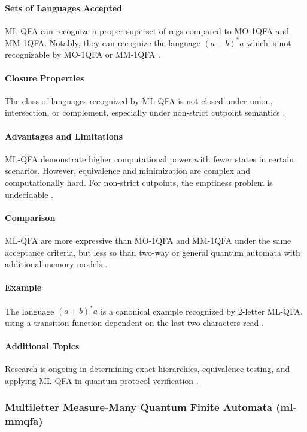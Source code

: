 \paragraph{Sets of Languages Accepted}
ML-QFA can recognize a proper superset of \glspl{reg} compared to MO-1QFA and MM-1QFA. Notably, they can recognize the language $(a + b)^*a$ which is not recognizable by MO-1QFA or MM-1QFA \cite{belovs2007multi}.

\paragraph{Closure Properties}
The class of languages recognized by ML-QFA is not closed under union, intersection, or complement, especially under non-strict cutpoint semantics \cite{qiu2009hierarchy}.

\paragraph{Advantages and Limitations}
ML-QFA demonstrate higher computational power with fewer states in certain scenarios. However, equivalence and minimization are complex and computationally hard. For non-strict cutpoints, the emptiness problem is undecidable \cite{qiu2008decidability}.

\paragraph{Comparison}
ML-QFA are more expressive than MO-1QFA and MM-1QFA under the same acceptance criteria, but less so than two-way or general quantum automata with additional memory models \cite{qiu2011multi}.

\paragraph{Example}
The language $(a + b)^*a$ is a canonical example recognized by 2-letter ML-QFA, using a transition function dependent on the last two characters read \cite{belovs2007multi}.

\paragraph{Additional Topics}
Research is ongoing in determining exact hierarchies, equivalence testing, and applying ML-QFA in quantum protocol verification \cite{lin2012equivalence, qiu2008decidability}.

\subsubsection{Multiletter Measure-Many Quantum Finite Automata (\gls{ml-mmqfa})}

